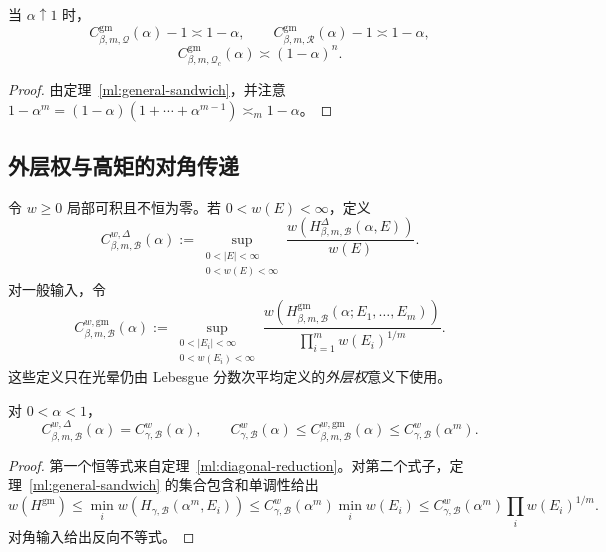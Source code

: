 \begin{corollary}[一般输入的端点指数]\label{ml:general-endpoint}
当 $\alpha\uparrow1$ 时，
\[
 C^{\mathrm{gm}}_{\beta,m,\mathcal Q}(\alpha)-1\asymp1-\alpha,
 \qquad
 C^{\mathrm{gm}}_{\beta,m,\mathcal R}(\alpha)-1\asymp1-\alpha,
\]
\[
 C^{\mathrm{gm}}_{\beta,m,\mathcal Q_c}(\alpha)
 \asymp(1-\alpha)^n.
\]
\end{corollary}

\begin{proof}
由定理~\ref{ml:general-sandwich}，并注意
$1-\alpha^m=(1-\alpha)(1+\cdots+\alpha^{m-1})\asymp_m1-\alpha$。
\end{proof}

\subsection{外层权与高矩的对角传递}

\begin{definition}[外层加权多线性常数]\label{ml:weighted-definition}
令 $w\geq0$ 局部可积且不恒为零。若 $0<w(E)<\infty$，定义
\[
 C^{w,\Delta}_{\beta,m,\mathcal B}(\alpha)
 :=\sup_{\substack{0<|E|<\infty\\0<w(E)<\infty}}
 \frac{w(H^{\Delta}_{\beta,m,\mathcal B}(\alpha,E))}{w(E)}.
\]
对一般输入，令
\[
 C^{w,\mathrm{gm}}_{\beta,m,\mathcal B}(\alpha)
 :=\sup_{\substack{0<|E_i|<\infty\\0<w(E_i)<\infty}}
 \frac{w(H^{\mathrm{gm}}_{\beta,m,\mathcal B}(\alpha;E_1,\ldots,E_m))}
 {\prod_{i=1}^m w(E_i)^{1/m}}.
\]
这些定义只在光晕仍由 Lebesgue 分数次平均定义的\emph{外层权}意义下使用。
\end{definition}

\begin{theorem}[外层权的对角约化与夹逼]\label{ml:weighted-sandwich}
对 $0<\alpha<1$，
\[
 C^{w,\Delta}_{\beta,m,\mathcal B}(\alpha)=C^w_{\gamma,\mathcal B}(\alpha),
 \qquad
 C^w_{\gamma,\mathcal B}(\alpha)
 \leq C^{w,\mathrm{gm}}_{\beta,m,\mathcal B}(\alpha)
 \leq C^w_{\gamma,\mathcal B}(\alpha^m).
\]
\end{theorem}

\begin{proof}
第一个恒等式来自定理~\ref{ml:diagonal-reduction}。对第二个式子，定理~\ref{ml:general-sandwich}
的集合包含和单调性给出
\[
 w(H^{\mathrm{gm}})\leq\min_iw(H_{\gamma,\mathcal B}(\alpha^m,E_i))
 \leq C^w_{\gamma,\mathcal B}(\alpha^m)\min_iw(E_i)
 \leq C^w_{\gamma,\mathcal B}(\alpha^m)\prod_iw(E_i)^{1/m}.
\]
对角输入给出反向不等式。
\end{proof}

